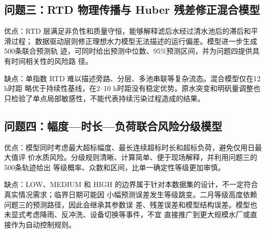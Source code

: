 \documentclass[UTF8,12pt,a4paper]{ctexart}
\begin{document}
  \subsection{ 问题三：RTD 物理传播与 Huber 残差修正混合模型}

  优点：RTD 层满足非负性和质量守恒，能够解释滤后水经过清水池后的滞后和平滑过程；
  数据驱动层则修正理想水力模型无法描述的运行偏差。模型进一步生成500条联合预测轨
  迹，可同时给出预测中位数、95\%预测区间，并为问题四提供具有时间相关性的风险路
  径。

  缺点：单指数 RTD 难以描述旁路、分层、多池串联等复杂流态。混合模型仅在12 h时距
  略优于持续性基线，在2--10 h时距没有稳定优势。原水突变和明矾量调整也只检验了单点局部敏感性，不能代表持续污染过程造成的结果。

  \subsection{ 问题四：幅度—时长—负荷联合风险分级模型}

  优点：模型同时考虑最大超标幅度、最长连续超标时长和超标负荷，避免仅用日最大值评
  价水质风险。分级规则清晰、计算简单、便于现场解释，并利用问题三的500条轨迹给出
  等级概率、众数和区间，比单一确定性等级更加审慎。

  缺点：LOW、MEDIUM 和 HIGH 的边界属于针对本数据集的设计，不一定符合真实情况需求；临界日期可能因
  小幅预测误差发生等级跳变。二月等级高度依赖问题三的预测路径，因此会继承其参数误
  差、残差误差和模型结构误差。模型也未显式考虑降雨、反冲洗、设备切换等事件，不宜
  直接推广到更大规模水厂或直接作为自动控制规则。


\end{document}
